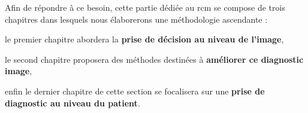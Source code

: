 Afin de répondre à ce besoin, cette partie dédiée au \gls{rcm} se compose de trois chapitres dans lesquels nous élaborerons une méthodologie ascendante :
\begin{inlinerate}
    \item le premier chapitre abordera la \textbf{prise de décision au niveau de l'image},
    \item le second chapitre proposera des méthodes destinées à \textbf{améliorer ce diagnostic image},
    \item enfin le dernier chapitre de cette section se focalisera sur une \textbf{prise de diagnostic au niveau du patient}.
\end{inlinerate}\par
\newpage